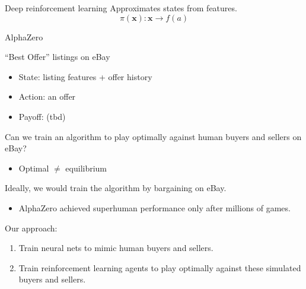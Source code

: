 \documentclass[aspectratio=169]{beamer}
\begin{document}
\begin{frame}{Deep reinforcement learning}
	Approximates states from features.
	$$\pi(\boldsymbol{x}): \boldsymbol{x} \rightarrow f(a)$$
\end{frame}

\begin{frame}{AlphaZero}

\end{frame}

\begin{frame}{``Best Offer'' listings on eBay}
	\begin{itemize}
		\item State: listing features + offer history
		\item Action: an offer
		\item Payoff: (tbd)
	\end{itemize}
	\vspace{5mm}
	Can we train an algorithm to play optimally against human buyers and sellers on eBay?\pause
	\begin{itemize}
		\item Optimal $\neq$ equilibrium
	\end{itemize}
\end{frame}


\begin{frame}
	Ideally, we would train the algorithm by bargaining on eBay.
	\begin{itemize}
		\item AlphaZero achieved superhuman performance only after millions of games.
	\end{itemize}\pause
	\vspace{5mm}
	Our approach:
	\begin{enumerate}
		\item Train neural nets to mimic human buyers and sellers.
		\item Train reinforcement learning agents to play optimally against these simulated buyers and sellers.
	\end{enumerate}
\end{frame}
\end{document}
